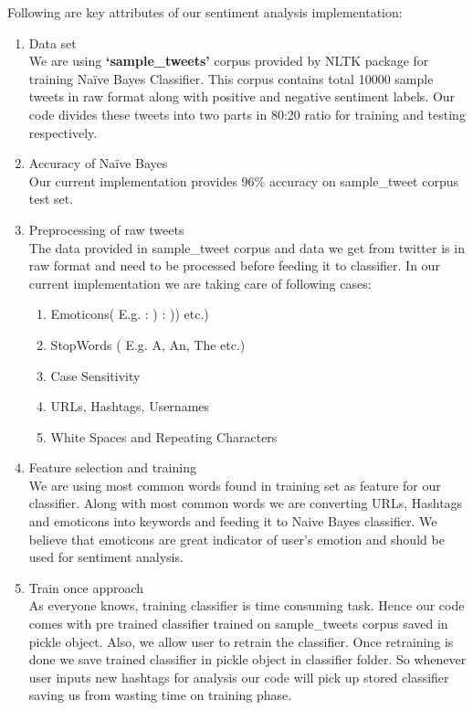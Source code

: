 \documentclass[journal, a4paper]{IEEEtran}
\begin{document}
Following are key attributes of our sentiment analysis implementation:\\
\begin{enumerate}
  \item Data set\\
We are using \textbf{‘sample\_tweets’} corpus provided by NLTK package for training Naïve Bayes Classifier. This corpus contains total 10000 sample tweets in raw format along with positive and negative sentiment labels. Our code divides these tweets into two parts in 80:20 ratio for training and testing respectively.
  \item Accuracy of Naïve Bayes\\
Our current implementation provides 96\% accuracy on sample\_tweet corpus test set.
\item Preprocessing of raw tweets\\
The data provided in sample\_tweet corpus and data we get from twitter is in raw format and need to be processed before feeding it to classifier. In our current implementation we are taking care of following cases:\\
\begin{enumerate}
  \item Emoticons( E.g. : ) : )) etc.)
  \item StopWords ( E.g. A, An, The etc.)
  \item Case Sensitivity
  \item URLs, Hashtags, Usernames
  \item White Spaces and Repeating Characters
\end{enumerate}
\item Feature selection and training\\
We are using most common words found in training set as feature for our classifier. Along with most common words we are converting URLs, Hashtags and emoticons into keywords and feeding it to Naive Bayes classifier. We believe that emoticons are great indicator of user’s emotion and should be used for sentiment analysis.
\item Train once approach\\
As everyone knows, training classifier is time consuming task. Hence our code comes with pre trained classifier trained  on sample\_tweets corpus saved in pickle object. Also, we allow user to retrain the classifier. Once retraining is done we save trained classifier in pickle object in classifier folder. So whenever user inputs new hashtags for analysis our code will pick up stored classifier saving us from wasting time on training phase.
\end{enumerate}
\end{document}
